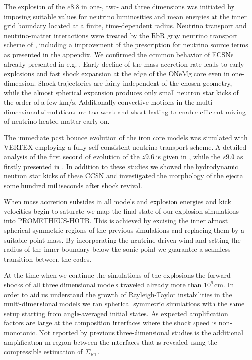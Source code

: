 \documentclass[fleqn,usenatbib]{mnras}
\newcommand{\kms}{\ensuremath{\mathrm{km/s}}\xspace}
\newcommand{\prom}{\textsc{P{\footnotesize ROMETHEUS}-H{\footnotesize OT}B}\xspace}
\newcommand{\vertex}{\textsc{V{\footnotesize ERTEX}}\xspace}
\begin{document}
The explosion of the $e8.8$ in one-, two- and three dimensions was initiated by imposing suitable values for neutrino luminosities and mean energies at the inner grid boundary located at a finite, time-dependent radius. Neutrino transport and neutrino-matter interactions were treated by the RbR gray neutrino transport scheme of \citet{Scheck2006}, including a improvement of the prescription for neutrino source terms as presented in the appendix. We confirmed the common behavior of ECSNe already presented in e.g. \citet{Kitaura2006,Gessner2018}. Early decline of the mass accretion rate leads to early explosions and fast shock expansion at the edge of the ONeMg core even in one-dimension. Shock trajectories are fairly independent of the chosen geometry, while the almost spherical expansion produces only small neutron star kicks of the order of a few \kms. Additionally convective motions in the multi-dimensional simulations are too weak and short-lasting to enable efficient mixing of neutrino-heated matter early on.

The immediate post bounce evolution of the iron core models was simulated with \vertex employing a fully self consistent neutrino transport scheme. A detailed analysis of the first second of evolution of the $z9.6$ is given in \citet{Melson2015a}, while the $s9.0$ as firstly presented in \citet{Melson2019}. 
In addition to these studies we showed the hydrodynamic neutron star kicks of these CCSN and investigated the morphology of the ejecta some hundred milliseconds after shock revival. 

When mass accretion subsides in all models and explosion energies and kick velocities begin to saturate we map the final state of our explosion simulations into \prom. This is achieved by excising the inner almost spherical symmetric regions of the previous simulations and replacing them by a suitable point mass. By incorporating the neutrino-driven wind and setting the radius of the inner boundary below the sonic point we guarantee a seamless transition between the codes.

At the time when we continue the simulations of the explosions the forward shocks of all three dimensional models traveled already more than $10^9\,\mathrm{cm}$. 
In order to aid us understand the growth of Rayleigh-Taylor instabilities in the multi-dimensional models we ran spherical symmetric simulations with the same setup starting from angle-averaged initial states. As expected amplification factors are large at the composition interfaces where the shock speed is non-monotonic. Not reported by previous three-dimensional studies is the additional amplification in region between the interfaces that is revealed using the compressible estimation of $\Sigma_{\mathrm{RT}}$.
\end{document}
